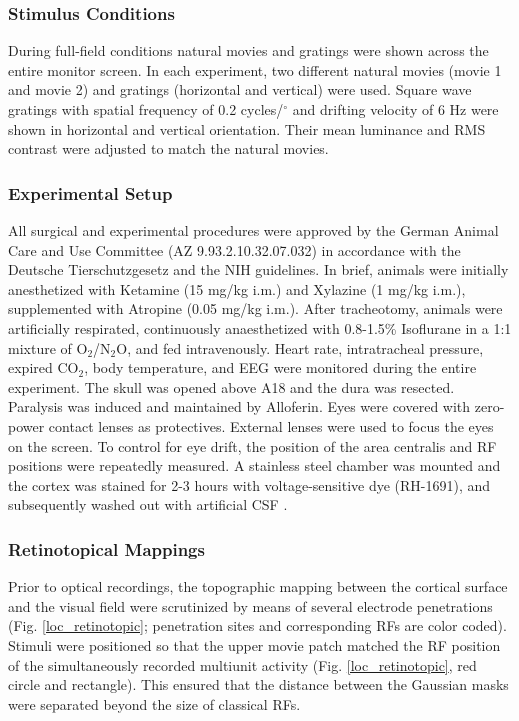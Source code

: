 \subsubsection{Stimulus Conditions}

During full-field conditions natural movies and gratings were shown across
the entire monitor screen. In each experiment, two different natural movies
(movie 1 and movie 2) and gratings (horizontal and vertical) were used.
Square wave gratings with spatial frequency of 0.2 cycles/$^{\circ}$ and
drifting velocity of 6 Hz were shown in horizontal and vertical
orientation. Their mean luminance and RMS contrast were adjusted to match
the natural movies.

\subsubsection{Experimental Setup}

All surgical and experimental procedures were approved by the German Animal
Care and Use Committee (AZ 9.93.2.10.32.07.032) in accordance with the
Deutsche Tierschutzgesetz and the NIH guidelines. In brief, animals were
initially anesthetized with Ketamine (15 mg/kg i.m.) and Xylazine (1 mg/kg
i.m.), supplemented with Atropine (0.05 mg/kg i.m.). After tracheotomy,
animals were artificially respirated, continuously anaesthetized with
0.8-1.5\% Isoflurane in a 1:1 mixture of O$_{{2}}$/N$_{{2}}$O, and fed
intravenously. Heart rate, intratracheal pressure, expired CO$_{{2}}$, body
temperature, and EEG were monitored during the entire experiment. The skull
was opened above A18 and the dura was resected.
Paralysis was induced and maintained by
Alloferin\textsuperscript{\textregistered}. Eyes were covered with
zero-power contact lenses as protectives. External lenses were used to
focus the eyes on the screen. To control for eye drift, the position of the
area centralis and RF positions were repeatedly measured. A
stainless steel chamber was mounted and the cortex was stained for 2-3
hours with voltage-sensitive dye (RH-1691), and subsequently washed out
with artificial CSF . 

\subsubsection{Retinotopical Mappings}

Prior to optical recordings, the topographic mapping between the cortical
surface and the visual field were scrutinized by means of several electrode
penetrations (Fig. \ref{loc_retinotopic}; penetration sites and
corresponding RFs are color coded). Stimuli were positioned so that the
upper movie patch matched the RF position of the simultaneously recorded
multiunit activity (Fig. \ref{loc_retinotopic}, red circle and rectangle).
This ensured that the distance between the Gaussian masks were separated
beyond the size of classical RFs.

